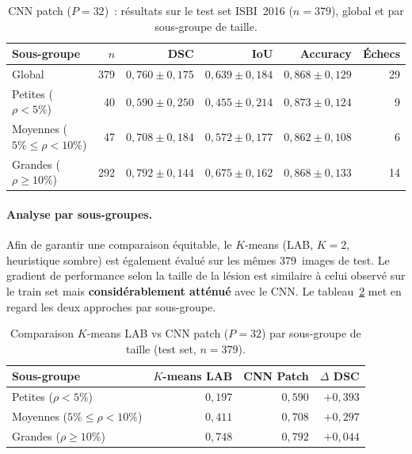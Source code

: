 \documentclass[12pt,a4paper]{article}
\begin{document}
\begin{table}[H]
\centering
\caption{CNN patch ($P = 32$)~: résultats sur le test set ISBI~2016 ($n = 379$), global et par sous-groupe de taille.}
\label{tab:cnn_test}
\begin{tabular}{l r r r r r}
\toprule
\textbf{Sous-groupe} & \textbf{$n$} & \textbf{DSC} & \textbf{IoU} & \textbf{Accuracy} & \textbf{Échecs} \\
\midrule
Global             & 379 & $0{,}760 \pm 0{,}175$ & $0{,}639 \pm 0{,}184$ & $0{,}868 \pm 0{,}129$ & 29 \\
\midrule
Petites ($\rho < 5\%$)     & 40  & $0{,}590 \pm 0{,}250$ & $0{,}455 \pm 0{,}214$ & $0{,}873 \pm 0{,}124$ & 9 \\
Moyennes ($5\% \leq \rho < 10\%$) & 47  & $0{,}708 \pm 0{,}184$ & $0{,}572 \pm 0{,}177$ & $0{,}862 \pm 0{,}108$ & 6 \\
Grandes ($\rho \geq 10\%$)  & 292 & $0{,}792 \pm 0{,}144$ & $0{,}675 \pm 0{,}162$ & $0{,}868 \pm 0{,}133$ & 14 \\
\bottomrule
\end{tabular}
\end{table}

\paragraph{Analyse par sous-groupes.} Afin de garantir une comparaison équitable, le $K$-means (LAB, $K = 2$, heuristique sombre) est également évalué sur les mêmes 379~images de test. Le gradient de performance selon la taille de la lésion est similaire à celui observé sur le train set mais \textbf{considérablement atténué} avec le CNN. Le tableau~\ref{tab:cnn_vs_kmeans_subgroups} met en regard les deux approches par sous-groupe.

\begin{table}[H]
\centering
\caption{Comparaison $K$-means LAB vs CNN patch ($P = 32$) par sous-groupe de taille (test set, $n = 379$).}
\label{tab:cnn_vs_kmeans_subgroups}
\begin{tabular}{l r r r}
\toprule
\textbf{Sous-groupe} & \textbf{$K$-means LAB} & \textbf{CNN Patch} & \textbf{$\Delta$ DSC} \\
\midrule
Petites ($\rho < 5\%$)     & $0{,}197$ & $0{,}590$ & $+0{,}393$ \\
Moyennes ($5\% \leq \rho < 10\%$) & $0{,}411$ & $0{,}708$ & $+0{,}297$ \\
Grandes ($\rho \geq 10\%$)  & $0{,}748$ & $0{,}792$ & $+0{,}044$ \\
\bottomrule
\end{tabular}
\end{table}
\end{document}
